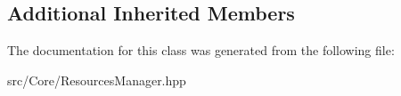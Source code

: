 \subsection*{Additional Inherited Members}


The documentation for this class was generated from the following file\+:\begin{DoxyCompactItemize}
\item 
src/\+Core/Resources\+Manager.\+hpp\end{DoxyCompactItemize}
